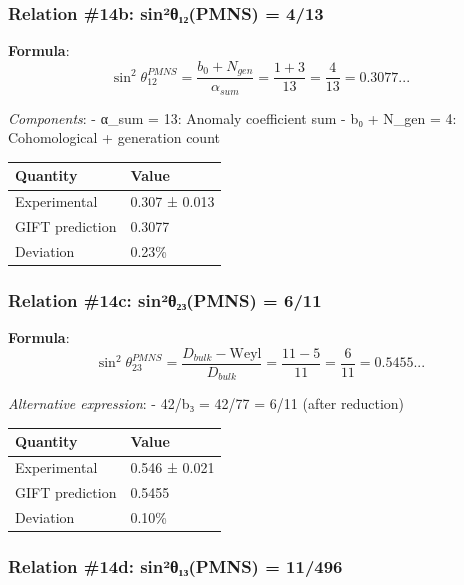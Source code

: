 \documentclass[11pt,a4paper]{article}
\begin{document}
\subsubsection{Relation \#14b: sin²θ₁₂(PMNS) = 4/13}\label{relation-14b-sinuxb2ux3b8ux2081ux2082pmns-413}

\textbf{Formula}:
\[\sin^2\theta_{12}^{PMNS} = \frac{b_0 + N_{gen}}{\alpha_{sum}} = \frac{1 + 3}{13} = \frac{4}{13} = 0.3077...\]

\emph{Components}:
- α\_sum = 13: Anomaly coefficient sum
- b₀ + N\_gen = 4: Cohomological + generation count

{\def\LTcaptype{none} %
\begin{longtable}[]{@{}ll@{}}
\toprule\noalign{}
Quantity & Value \\
\midrule\noalign{}
\endhead
\bottomrule\noalign{}
\endlastfoot
Experimental & 0.307 ± 0.013 \\
GIFT prediction & 0.3077 \\
Deviation & 0.23\% \\
\end{longtable}
}

\subsubsection{Relation \#14c: sin²θ₂₃(PMNS) = 6/11}\label{relation-14c-sinuxb2ux3b8ux2082ux2083pmns-611}

\textbf{Formula}:
\[\sin^2\theta_{23}^{PMNS} = \frac{D_{bulk} - \text{Weyl}}{D_{bulk}} = \frac{11 - 5}{11} = \frac{6}{11} = 0.5455...\]

\emph{Alternative expression}:
- 42/b₃ = 42/77 = 6/11 (after reduction)

{\def\LTcaptype{none} %
\begin{longtable}[]{@{}ll@{}}
\toprule\noalign{}
Quantity & Value \\
\midrule\noalign{}
\endhead
\bottomrule\noalign{}
\endlastfoot
Experimental & 0.546 ± 0.021 \\
GIFT prediction & 0.5455 \\
Deviation & 0.10\% \\
\end{longtable}
}

\subsubsection{Relation \#14d: sin²θ₁₃(PMNS) = 11/496}\label{relation-14d-sinuxb2ux3b8ux2081ux2083pmns-11496}
\end{document}
